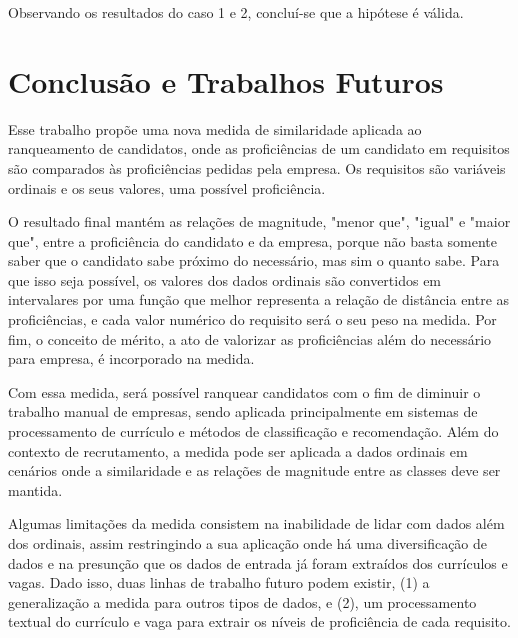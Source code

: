 \documentclass[preprint,12pt]{elsarticle}
\begin{document}
Observando os resultados do caso 1 e 2, concluí-se que a hipótese é válida.

\section{Conclusão e Trabalhos Futuros}
\label{sec:sample5}

Esse trabalho propõe uma nova medida de similaridade aplicada ao ranqueamento de candidatos, onde as proficiências de um candidato em requisitos são comparados às proficiências pedidas pela empresa. Os requisitos são variáveis ordinais e os seus valores, uma possível proficiência. 

O resultado final mantém as relações de magnitude, "menor que", "igual" e "maior que", entre a proficiência do candidato e da empresa, porque não basta somente saber que o candidato sabe próximo do necessário, mas sim o quanto sabe. Para que isso seja possível, os valores dos dados ordinais são convertidos em intervalares por uma função que melhor representa a relação de distância entre as proficiências, e cada valor numérico do requisito será o seu peso na medida. Por fim, o conceito de mérito, a ato de valorizar as proficiências além do necessário para empresa, é incorporado na medida.

Com essa medida, será possível ranquear candidatos com o fim de diminuir o trabalho manual de empresas, sendo aplicada principalmente em sistemas de processamento de currículo e métodos de classificação e recomendação. Além do contexto de recrutamento, a medida pode ser aplicada a dados ordinais em cenários onde a similaridade e as relações de magnitude entre as classes deve ser mantida.

Algumas limitações da medida consistem na inabilidade de lidar com dados além dos ordinais, assim restringindo a sua aplicação onde há uma diversificação de dados e na presunção que os dados de entrada já foram extraídos dos currículos e vagas. Dado isso, duas linhas de trabalho futuro podem existir, (1) a generalização a medida para outros tipos de dados, e (2), um processamento textual do currículo e vaga para extrair os níveis de proficiência de cada requisito.
\end{document}
